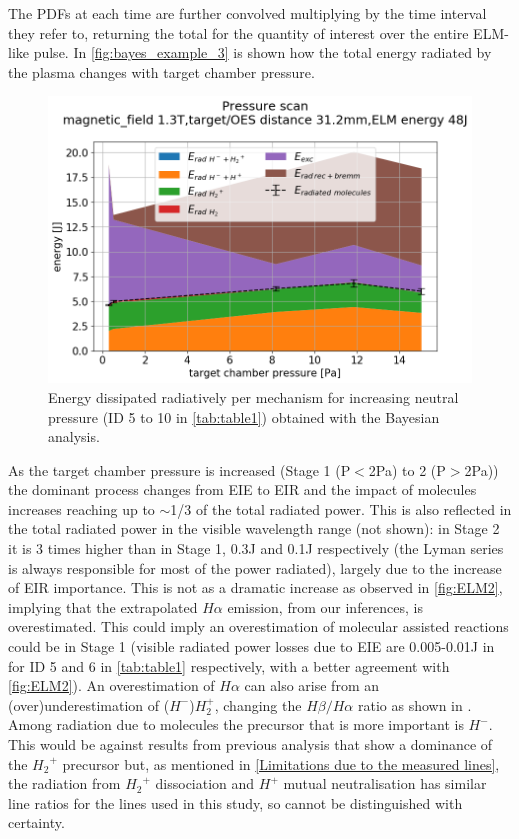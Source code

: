 The PDFs at each time are further convolved multiplying by the time interval they refer to, returning the total for the quantity of interest over the entire ELM-like pulse. In \autoref{fig:bayes_example_3} is shown how the total energy radiated by the plasma changes with target chamber pressure.
\begin{figure}[!ht]
	\centering
	\includegraphics[width=0.7\linewidth,trim={0 0 30 60},clip]{Chapters/chapter3/figs/Bayesian_strong_4.png}
	\caption{Energy dissipated radiatively per mechanism for increasing neutral pressure (ID 5 to 10 in \autoref{tab:table1}) obtained with the Bayesian analysis.}
	\label{fig:bayes_example_3}
\end{figure}
As the target chamber pressure is increased (Stage 1 (P$<$2Pa) to 2 (P$>$2Pa)) the dominant process changes from EIE to EIR and the impact of molecules increases reaching up to $\sim$1/3 of the total radiated power. This is also reflected in the total radiated power in the visible wavelength range (not shown): in Stage 2 it is 3 times higher than in Stage 1, 0.3J and 0.1J respectively (the Lyman series is always responsible for most of the power radiated), largely due to the increase of EIR importance. This is not as a dramatic increase as observed in \autoref{fig:ELM2}, implying that the extrapolated $H\alpha$ emission, from our inferences, is overestimated. This could imply an overestimation of molecular assisted reactions could be in Stage 1 (visible radiated power losses due to EIE are 0.005-0.01J in for ID 5 and 6 in \autoref{tab:table1} respectively, with a better agreement with \autoref{fig:ELM2}). An overestimation of $H\alpha$ can also arise from an (over)underestimation of ($H^-$)$H_2^+$, changing the $H\beta/H\alpha$ ratio as shown in \cite{Verhaegh2020}. Among radiation due to molecules the precursor that is more important is $H^-$. This would be against results from previous analysis that show a dominance of the ${H_2}^+$ precursor\cite{Akkermans2020} but, as mentioned in \autoref{Limitations due to the measured lines}, the radiation from ${H_2}^+$ dissociation and $H^+$ mutual neutralisation has similar line ratios for the lines used in this study, so cannot be distinguished with certainty.

